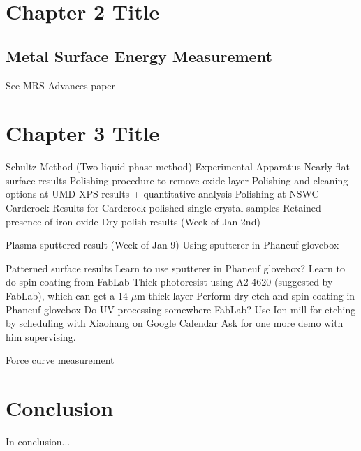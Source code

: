 \documentclass[12pt,letterpaper]{report}
\begin{document}


\newpage
\chapter{Chapter 2 Title}
\section{Metal Surface Energy Measurement}\label{section2}

\begin{outline}[enumerate]
\1 See MRS Advances paper
	
\end{outline}




\chapter{Chapter 3 Title}

\begin{outline}[enumerate]
\1 Schultz Method (Two-liquid-phase method)
	\2 Experimental Apparatus
\1 Nearly-flat surface results
	\2 Polishing procedure to remove oxide layer
		\3 Polishing and cleaning options at UMD
			\4 XPS results + quantitative analysis
		\3 Polishing at NSWC Carderock
	\2 Results for Carderock polished single crystal samples
		\3 Retained presence of iron oxide
	\2 Dry polish results (Week of Jan 2nd)
	
	\2 Plasma sputtered result (Week of Jan 9)
		\3 Using sputterer in Phaneuf glovebox
		
\1 Patterned surface results
	\2 Learn to use sputterer in Phaneuf glovebox?
	\2 Learn to do spin-coating from FabLab
		\3 Thick photoresist using A2 4620 (suggested by FabLab), which can get a 14 $\mu$m thick layer
	\2 Perform dry etch and spin coating in Phaneuf glovebox
	\2 Do UV processing somewhere
		\3 FabLab?
	\2 Use Ion mill for etching by scheduling with Xiaohang on Google Calendar
		\3 Ask for one more demo with him supervising. 
	
\1 Force curve measurement
	
	
	
\end{outline}




\chapter{Conclusion}
In conclusion...
\end{document}
